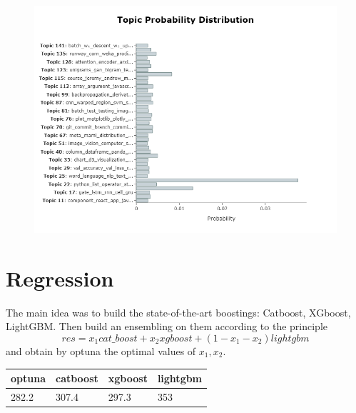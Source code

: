 \documentclass[12pt]{report}
\begin{document}
\begin{figure}[H]
    \centering
    \includegraphics[scale=0.5]{topic_distribution.png} 
\end{figure}
\section{Regression}
The main idea was to build the state-of-the-art boostings: Catboost, XGboost, LightGBM. Then build an ensembling on them according to the principle
\[ res = x_1 cat\_boost + x_2 xgboost + (1-x_1-x_2) lightgbm\]
and obtain by optuna the optimal values of $x_1, x_2$. 
\begin{table}[H]
    \centering
    \begin{tabular}{|l|l|l|l|}
    \hline
    optuna & catboost & xgboost & lightgbm \\ \hline
    282.2  & 307.4    & 297.3   & 353      \\ \hline
    \end{tabular}
    \end{table}
\end{document}
